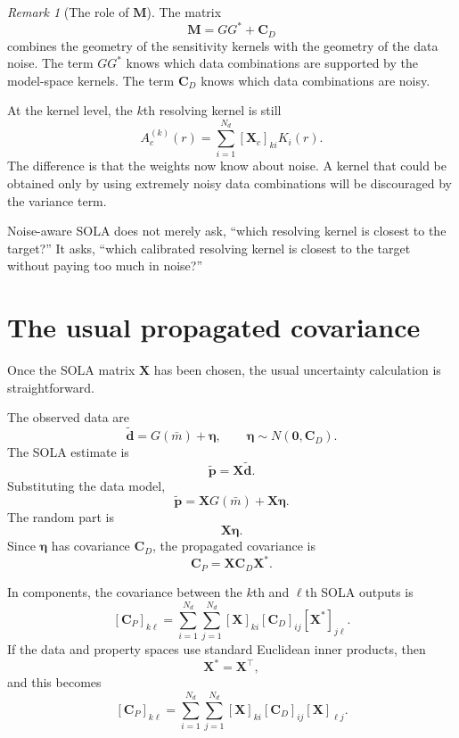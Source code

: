 \documentclass[11pt,openany]{book}
\theoremstyle{definition}
\theoremstyle{remark}
\newtheorem{remark}{Remark}[chapter]
\begin{document}
\begin{remark}[The role of \(\mathbf M\)]
The matrix
\[
  \mathbf M=GG^*+\mathbf C_D
\]
combines the geometry of the sensitivity kernels with the geometry of the data noise. The term
\(GG^*\) knows which data combinations are supported by the model-space kernels. The term
\(\mathbf C_D\) knows which data combinations are noisy.
\end{remark}

At the kernel level, the \(k\)th resolving kernel is still
\[
  A_c^{(k)}(r)
  =
  \sum_{i=1}^{N_d}
  [\mathbf X_c]_{ki}K_i(r).
\]
The difference is that the weights now know about noise. A kernel that could be obtained only by
using extremely noisy data combinations will be discouraged by the variance term.

\begin{lessonbox}
Noise-aware SOLA does not merely ask, ``which resolving kernel is closest to the target?'' It asks,
``which calibrated resolving kernel is closest to the target without paying too much in noise?''
\end{lessonbox}

\section{The usual propagated covariance}

Once the SOLA matrix \(\mathbf X\) has been chosen, the usual uncertainty calculation is
straightforward.

The observed data are
\[
  \widetilde{\mathbf d}
  =
  G(\bar m)+\boldsymbol\eta,
  \qquad
  \boldsymbol\eta\sim N(\mathbf 0,\mathbf C_D).
\]
The SOLA estimate is
\[
  \widetilde{\mathbf p}
  =
  \mathbf X\widetilde{\mathbf d}.
\]
Substituting the data model,
\[
  \widetilde{\mathbf p}
  =
  \mathbf XG(\bar m)
  +
  \mathbf X\boldsymbol\eta.
\]
The random part is
\[
  \mathbf X\boldsymbol\eta.
\]
Since \(\boldsymbol\eta\) has covariance \(\mathbf C_D\), the propagated covariance is
\[
  \mathbf C_P
  =
  \mathbf X\mathbf C_D\mathbf X^*.
\]

In components, the covariance between the \(k\)th and \(\ell\)th SOLA outputs is
\[
  [\mathbf C_P]_{k\ell}
  =
  \sum_{i=1}^{N_d}
  \sum_{j=1}^{N_d}
  [\mathbf X]_{ki}
  [\mathbf C_D]_{ij}
  [\mathbf X^*]_{j\ell}.
\]
If the data and property spaces use standard Euclidean inner products, then
\[
  \mathbf X^*=\mathbf X^\top,
\]
and this becomes
\[
  [\mathbf C_P]_{k\ell}
  =
  \sum_{i=1}^{N_d}
  \sum_{j=1}^{N_d}
  [\mathbf X]_{ki}
  [\mathbf C_D]_{ij}
  [\mathbf X]_{\ell j}.
\]
\end{document}
